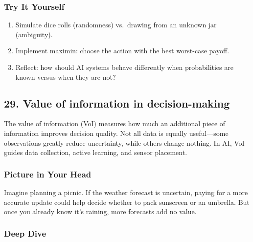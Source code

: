 \documentclass[
  letterpaper,
  DIV=11,
  numbers=noendperiod]{scrreprt}
\providecommand{\tightlist}{%
  \setlength{\itemsep}{0pt}\setlength{\parskip}{0pt}}
\begin{document}
\subsubsection{Try It Yourself}\label{try-it-yourself-27}

\begin{enumerate}
\def\labelenumi{\arabic{enumi}.}
\tightlist
\item
  Simulate dice rolls (randomness) vs.~drawing from an unknown jar
  (ambiguity).
\item
  Implement maximin: choose the action with the best worst-case payoff.
\item
  Reflect: how should AI systems behave differently when probabilities
  are known versus when they are not?
\end{enumerate}

\subsection{29. Value of information in
decision-making}\label{value-of-information-in-decision-making}

The value of information (VoI) measures how much an additional piece of
information improves decision quality. Not all data is equally
useful---some observations greatly reduce uncertainty, while others
change nothing. In AI, VoI guides data collection, active learning, and
sensor placement.

\subsubsection{Picture in Your Head}\label{picture-in-your-head-28}

Imagine planning a picnic. If the weather forecast is uncertain, paying
for a more accurate update could help decide whether to pack sunscreen
or an umbrella. But once you already know it's raining, more forecasts
add no value.

\subsubsection{Deep Dive}\label{deep-dive-28}
\end{document}
